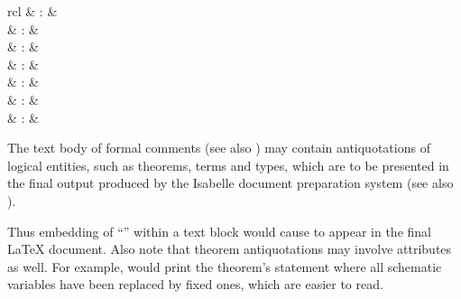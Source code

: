 \begin{isabellebody}
\begin{isamarkuptext}
\begin{matharray}{rcl}
    \hypertarget{antiquotation.goals}{\hyperlink{antiquotation.goals}{\mbox{}}} & : & \isarantiq \\
    \hypertarget{antiquotation.subgoals}{\hyperlink{antiquotation.subgoals}{\mbox{}}} & : & \isarantiq \\
    \hypertarget{antiquotation.prf}{\hyperlink{antiquotation.prf}{\mbox{}}} & : & \isarantiq \\
    \hypertarget{antiquotation.full-prf}{\hyperlink{antiquotation.full-prf}{\mbox{}}} & : & \isarantiq \\
    \hypertarget{antiquotation.ML}{\hyperlink{antiquotation.ML}{\mbox{}}} & : & \isarantiq \\
    \hypertarget{antiquotation.ML-type}{\hyperlink{antiquotation.ML-type}{\mbox{}}} & : & \isarantiq \\
    \hypertarget{antiquotation.ML-struct}{\hyperlink{antiquotation.ML-struct}{\mbox{}}} & : & \isarantiq \\
  \end{matharray}

  The text body of formal comments (see also )
  may contain antiquotations of logical entities, such as theorems,
  terms and types, which are to be presented in the final output
  produced by the Isabelle document preparation system (see also
  ).

  Thus embedding of ``''
  within a text block would cause
   to appear in the final {\LaTeX} document.  Also note that theorem
  antiquotations may involve attributes as well.  For example,
   would print the theorem's
  statement where all schematic variables have been replaced by fixed
  ones, which are easier to read.


\end{isamarkuptext}
\end{isabellebody}
